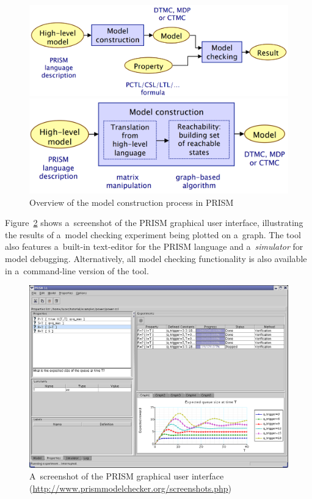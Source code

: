 \documentclass[a4paper, 11pt]{article}
\theoremstyle{definition}
\begin{document}
\begin{figure}[hbt]
    \centering

    \begin{minipage}{.49 \linewidth}
        \centering
        \includegraphics[width=.9 \linewidth]{prism-overview.png}
        \caption{%
            Overview of the workflow of PRISM~\cite{probModelCheckLec}%
        }
        \label{fig:prismOverview}
    \end{minipage}
%
    \begin{minipage}{.49 \linewidth}
        \centering
        \includegraphics[width=.9 \linewidth]{prism-model-construction.png}
        \caption{%
            Overview of the model construction process in
            PRISM~\cite{probModelCheckLec}%
        }
        \label{fig:prismModelConstruction}
    \end{minipage}
\end{figure}

Figure~\ref{fig:prismGui} shows a~screenshot of the PRISM graphical user
interface, illustrating the results of a~model checking experiment being
plotted on a~graph. The tool also features a~built-in text-editor for the
PRISM language and a~\emph{simulator} for model debugging. Alternatively, all
model checking functionality is also available in a~command-line version of
the tool.

\begin{figure}[hbt]
    \centering
    \includegraphics[width=.7 \linewidth]{prism-gui.png}
    \caption{%
        A~screenshot of the PRISM graphical user interface \\
        (\url{http://www.prismmodelchecker.org/screenshots.php})%
    }
    \label{fig:prismGui}
\end{figure}
\end{document}
